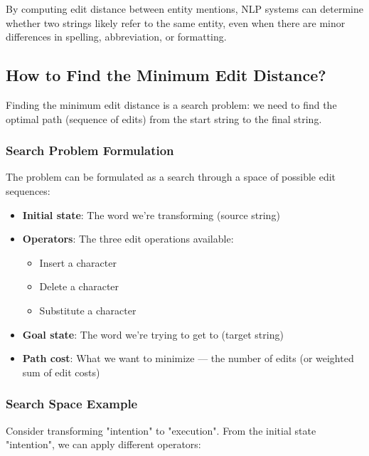 \documentclass[11pt,a4paper]{article}
\theoremstyle{definition}
\theoremstyle{plain}
\theoremstyle{remark}
\begin{document}
By computing edit distance between entity mentions, NLP systems can determine whether two strings likely refer to the same entity, even when there are minor differences in spelling, abbreviation, or formatting.

\subsection{How to Find the Minimum Edit Distance?}

Finding the minimum edit distance is a search problem: we need to find the optimal path (sequence of edits) from the start string to the final string.

\subsubsection{Search Problem Formulation}

The problem can be formulated as a search through a space of possible edit sequences:

\begin{itemize}
    \item \textbf{Initial state}: The word we're transforming (source string)
    \item \textbf{Operators}: The three edit operations available:
    \begin{itemize}
        \item Insert a character
        \item Delete a character
        \item Substitute a character
    \end{itemize}
    \item \textbf{Goal state}: The word we're trying to get to (target string)
    \item \textbf{Path cost}: What we want to minimize — the number of edits (or weighted sum of edit costs)
\end{itemize}

\subsubsection{Search Space Example}

Consider transforming "intention" to "execution". From the initial state "intention", we can apply different operators:

\begin{center}
\end{center}
\end{document}
